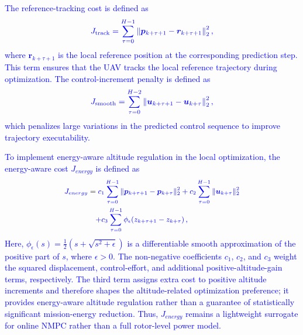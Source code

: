 \documentclass[lettersize,journal]{IEEEtran}
\newcommand{\vect}[1]{\boldsymbol{#1}}
\begin{document}
\textcolor{blue}{The reference-tracking cost is defined as}
\begin{equation}
	\textcolor{blue}{J_{\text{track}} = \sum_{\tau=0}^{H-1} \left\|\vect{p}_{k+\tau+1} - \vect{r}_{k+\tau+1}\right\|_2^2,}
	\label{eq:jtrack}
\end{equation}
\textcolor{blue}{where $\vect{r}_{k+\tau+1}$ is the local reference position at the corresponding prediction step. This term ensures that the UAV tracks the local reference trajectory during optimization. The control-increment penalty is defined as}
\begin{equation}
	\textcolor{blue}{J_{\text{smooth}} = \sum_{\tau=0}^{H-2} \left\|\vect{u}_{k+\tau+1} - \vect{u}_{k+\tau}\right\|_2^2,}
	\label{eq:jsmooth}
\end{equation}
\textcolor{blue}{which penalizes large variations in the predicted control sequence to improve trajectory executability.}

\textcolor{blue}{To implement energy-aware altitude regulation in the local optimization, the energy-aware cost $J_{energy}$ is defined as}
\begin{equation}
	\small
	\begin{aligned}
		\textcolor{blue}{J_{energy}}
		&= \textcolor{blue}{c_1 \sum_{\tau=0}^{H-1} \| \vect{p}_{k+\tau+1} - \vect{p}_{k+\tau} \|_2^2 + c_2 \sum_{\tau=0}^{H-1} \| \vect{u}_{k+\tau} \|_2^2} \\
		&\quad \textcolor{blue}{+ c_3 \sum_{\tau=0}^{H-1} \phi_{\epsilon}\!\left(z_{k+\tau+1} - z_{k+\tau}\right),}
	\end{aligned}
	\label{eq:jenergy}
\end{equation}
\textcolor{blue}{Here, $\phi_{\epsilon}(s)=\frac{1}{2}\left(s+\sqrt{s^2+\epsilon}\right)$ is a differentiable smooth approximation of the positive part of $s$, where $\epsilon>0$. The non-negative coefficients $c_1$, $c_2$, and $c_3$ weight the squared displacement, control-effort, and additional positive-altitude-gain terms, respectively. The third term assigns extra cost to positive altitude increments and therefore shapes the altitude-related optimization preference; it provides energy-aware altitude regulation rather than a guarantee of statistically significant mission-energy reduction. Thus, $J_{energy}$ remains a lightweight surrogate for online NMPC rather than a full rotor-level power model.}
\end{document}
